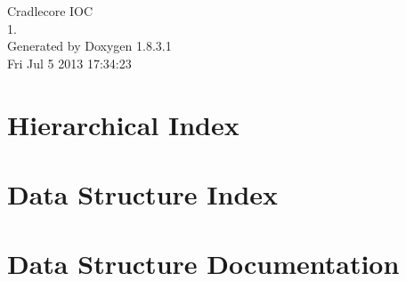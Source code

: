 \documentclass{book}
\begin{document}
\hypersetup{pageanchor=false,citecolor=blue}
\begin{titlepage}
\vspace*{7cm}
\begin{center}
{\Large Cradlecore I\-O\-C \\[1ex]\large 1. }\\
\vspace*{1cm}
{\large Generated by Doxygen 1.8.3.1}\\
\vspace*{0.5cm}
{\small Fri Jul 5 2013 17:34:23}\\
\end{center}
\end{titlepage}
\clearemptydoublepage
{}
\tableofcontents
\clearemptydoublepage
{}
\hypersetup{pageanchor=true,citecolor=blue}
\chapter{Hierarchical Index}

\chapter{Data Structure Index}

\chapter{Data Structure Documentation}




















\printindex
\end{document}
